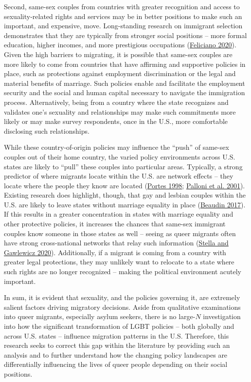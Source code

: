 \documentclass[
  11pt,
]{article}
\begin{document}
Second, same-sex couples from countries with greater recognition and access to sexuality-related rights and services may be in better positions to make such an important, and expensive, move. Long-standing research on immigrant selection demonstrates that they are typically from stronger social positions -- more formal education, higher incomes, and more prestigious occupations (\protect\hyperlink{ref-feliciano_2020}{Feliciano 2020}). Given the high barriers to migrating, it is possible that same-sex couples are more likely to come from countries that have affirming and supportive policies in place, such as protections against employment discrimination or the legal and material benefits of marriage. Such policies enable and facilitate the employment security and the social and human capital necessary to navigate the immigration process. Alternatively, being from a country where the state recognizes and validates one's sexuality and relationships may make such commitments more likely or may make survey respondents, once in the U.S., more comfortable disclosing such relationships.

While these country-of-origin policies may influence the ``push'' of same-sex couples out of their home country, the varied policy environments across U.S. states are likely to ``pull'' these couples into particular areas. Typically, a strong predictor of where migrants locate within the U.S. are network effects -- they locate where the people they know are located (\protect\hyperlink{ref-portes_1998}{Portes 1998}; \protect\hyperlink{ref-palloni_2001}{Palloni et al. 2001}). Existing research does highlight, though, that gay and lesbian couples within the U.S. are likely to leave states without marriage equality in place (\protect\hyperlink{ref-beaudin_2017}{Beaudin 2017}). If this results in a greater concentration in states with marriage equality and other protective policies, it increases the chances that same-sex immigrant couples know someone in those states as well -- seeing as queer migrants often have strong cross-national networks that relay such information (\protect\hyperlink{ref-stella_2020}{Stella and Gawlewicz 2020}). Additionally, if a migrant is coming from a country with greater legal protections, they may unlikely want to relocate to a state where such rights are no longer recognized -- making the political environment acutely important.

In sum, it is evident that sexuality, and the policies governing it, are extremely salient factors driving migratory decisions. Aside from qualitative examinations into queer migrants, especially asylum seekers, there is no large-\(N\) investigation into how the significant transformation of LGBT policies -- both globally and across U.S. states -- influence migration patterns in the U.S. Therefore, this research seeks to correct this gap within the literature by providing such an analysis and to further understand how the changing policy landscapes are differentially influencing the lives of queer people depending on their social positions.
\end{document}
